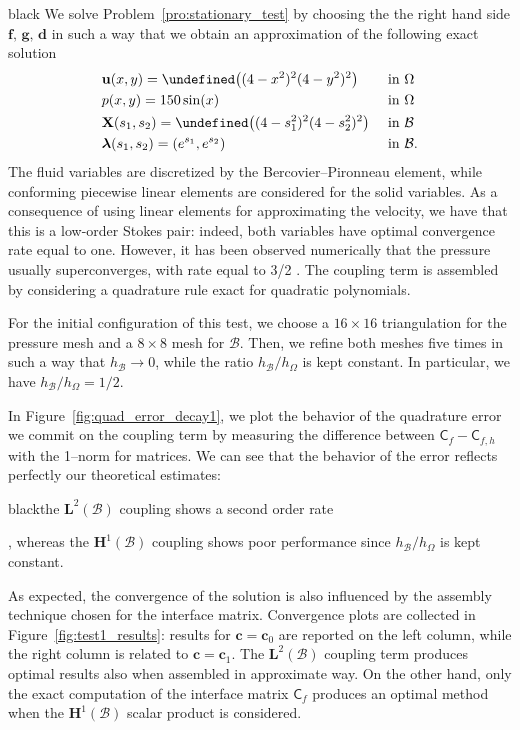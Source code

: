 \documentclass[oneside]{amsart} %
\let\curl\undefined\DeclareMathOperator{\curl}{curl} %
\newcommand\Hub{\mathbf{H}^1(\B)} %
\newcommand\LdBd{\mathbf{L}^2(\B)} %
\newcommand\B{\mathcal B} %
\renewcommand\u{\mathbf{u}} %
\renewcommand\d{\mathbf{d}} %
\renewcommand\c{\mathbf{c}} %
\newcommand\f{\mathbf{f}} %
\newcommand\g{\mathbf{g}} %
\newcommand\X{\mathbf{X}} %
\newcommand\llambda{\boldsymbol\lambda} %
\newcommand{\Cmatr}{\mathsf{C}}
\renewcommand\lg{\begin{color}{black}}
\newcommand\gl{\end{color}}
\newcommand\DB{\begin{color}{black}}
\newcommand\BD{\end{color}}
\begin{document}
	\DB
	We solve Problem~\ref{pro:stationary_test} by choosing the the right hand side $\f,\,\g,\,\d$ in such a way that we obtain an approximation of the following exact solution
	\begin{equation*}
		\begin{aligned}
			&\u(x,y) = \curl\big((4-x^2)^2(4-y^2)^2\big) &&\text{ in }\Omega\\
			&p(x,y) = 150\sin(x)&&\text{ in }\Omega\\
			&\X(s_1,s_2) = \curl\big((4-s_1^2)^2(4-s_2^2)^2\big)&&\text{ in }\B\\
			&\llambda(s_1,s_2) = \left( e^{s_1}, e^{s_2}\right)&&\text{ in }\B.
		\end{aligned}
	\end{equation*}
	The fluid variables are  discretized by the Bercovier--Pironneau element, while conforming piecewise linear elements are considered for the solid variables. As a consequence of using linear elements for approximating the velocity, we have that this is a low-order Stokes pair: indeed, both variables have optimal convergence rate equal to one. However, it has been observed numerically that the pressure usually superconverges, with rate equal to 3/2 \cite{mass}. The coupling term is assembled by considering a quadrature rule exact for quadratic polynomials.
	\BD
	
	For the initial configuration of this test, we choose a $16\times 16$ triangulation for the pressure mesh and a $8\times8$ mesh for $\B$. Then, we refine both meshes five times in such a way that $h_\B\rightarrow0$, while the ratio $h_\B/h_\Omega$ is kept constant. In particular, we have $h_\B/h_\Omega=1/2$.
	
	In Figure~\ref{fig:quad_error_decay1}, we plot the behavior of the
	quadrature error we commit on the coupling term by measuring the difference
	between $\Cmatr_f - \Cmatr_{f,h}$ with the 1--norm for matrices. We can see
	that the behavior of the error reflects perfectly our theoretical estimates:
	\lg the $\LdBd$ coupling shows a second order rate\gl, whereas the $\Hub$ coupling shows poor performance since $h_\B/h_\Omega$ is kept constant.
	
	As expected, the convergence of the solution is also influenced by the assembly technique chosen for the interface matrix. Convergence plots are collected in  Figure~\ref{fig:test1_results}: results for $\c=\c_0$ are reported on the left column, while the right column is related to $\c=\c_1$. The $\LdBd$ coupling term produces optimal results also when assembled in approximate way. On the other hand, only the exact computation of the interface matrix $\Cmatr_f$ produces an optimal method when the $\Hub$ scalar product is considered.
	
\end{document}
